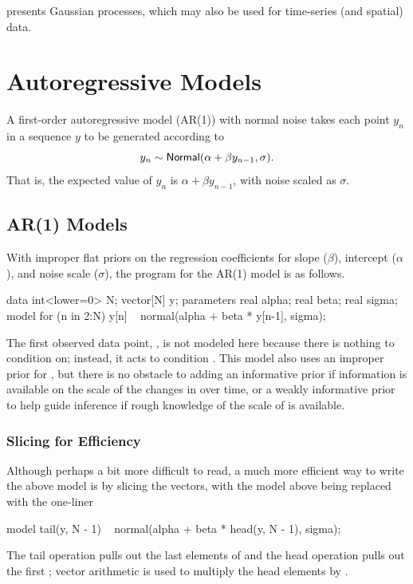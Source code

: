  presents Gaussian processes, which may
also be used for time-series (and spatial) data.


\section{Autoregressive Models}

A first-order autoregressive model (AR(1)) with normal noise takes
each point $y_n$ in a sequence $y$ to be generated according to
%
\[
y_n \sim \distro{Normal}(\alpha + \beta y_{n-1}, \sigma).
\]
%
That is, the expected value of $y_n$ is $\alpha + \beta y_{n-1}$, with
noise scaled as $\sigma$.

\subsection{AR(1) Models}

With improper flat priors on the regression coefficients for slope
($\beta$), intercept ($\alpha$), and noise scale ($\sigma$),
the \Stan program for the AR(1) model is as follows.
%
\begin{stancode}
data {
  int<lower=0> N;
  vector[N] y;
}
parameters {
  real alpha;
  real beta;
  real sigma;
}
model {
  for (n in 2:N)
    y[n] ~ normal(alpha + beta * y[n-1], sigma);
}
\end{stancode}
%
The first observed data point, , is not modeled here
because there is nothing to condition on; instead, it acts to
condition .  This model also uses an improper prior for
, but there is no obstacle to adding an informative prior
if information is available on the scale of the changes in 
over time, or a weakly informative prior to help guide inference if
rough knowledge of the scale of  is available.

\subsubsection{Slicing for Efficiency}

Although perhaps a bit more difficult to read, a much more efficient
way to write the above model is by slicing the vectors, with the model
above being replaced with the one-liner
%
\begin{stancode}
model {
  tail(y, N - 1) ~ normal(alpha + beta * head(y, N - 1), sigma);
}
\end{stancode}
%
The tail operation pulls out the last  elements of
 and the head operation pulls out the first ;
vector arithmetic is used to multiply the head elements by
.  



